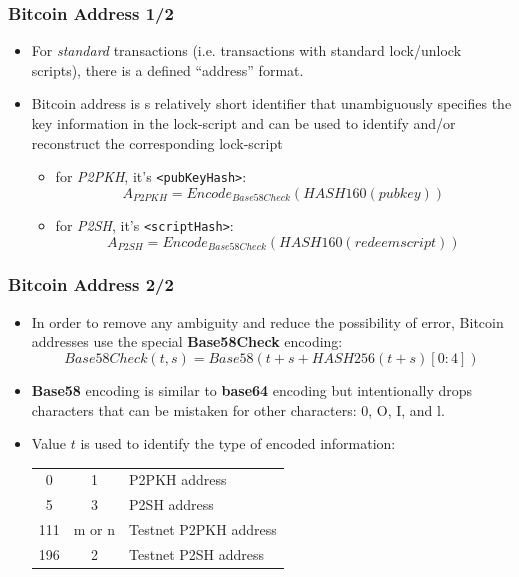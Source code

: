 \documentclass{beamer}
\begin{document}
\begin{frame}[fragile]
  \frametitle{Bitcoin Address 1/2}
  \begin{itemize}
  \item For \textit{standard} transactions (i.e. transactions with standard
    lock/unlock scripts), there is a defined ``address'' format.    
  \item Bitcoin address is s relatively short identifier that unambiguously
    specifies the key information in the lock-script and can be used to identify
    and/or reconstruct the corresponding lock-script
    \begin{itemize}
    \item for \textit{P2PKH}, it's \texttt{<pubKeyHash>}:
      $$A_{P2PKH} = Encode_{Base58Check}(HASH160(pubkey))$$
    \item for \textit{P2SH}, it's \texttt{<scriptHash>}:
      $$A_{P2SH} = Encode_{Base58Check}(HASH160(redeemscript))$$
    \end{itemize}
  \end{itemize}
\end{frame}

\begin{frame}[fragile]
  \frametitle{Bitcoin Address 2/2}
  \begin{itemize}
  \item In order to remove any ambiguity and reduce the possibility of error,
    Bitcoin addresses use the special \textbf{Base58Check} encoding:
    $$Base58Check(t, s) = Base58(t + s + HASH256(t + s)[0:4])$$
  \item \textbf{Base58} encoding is similar to \textbf{base64} encoding but
    intentionally drops characters that can be mistaken for other characters: 0,
    O, I, and l.
  \item Value $t$ is used to identify the type of encoded information:
    \break
    \begin{tabular}{ccl}
      0 & 1 & P2PKH address \\
      5 & 3 & P2SH address \\
      111 & m or n & Testnet P2PKH address \\
      196 & 2 & Testnet P2SH address \\
    \end{tabular}
  \end{itemize}
\end{frame}
\end{document}

